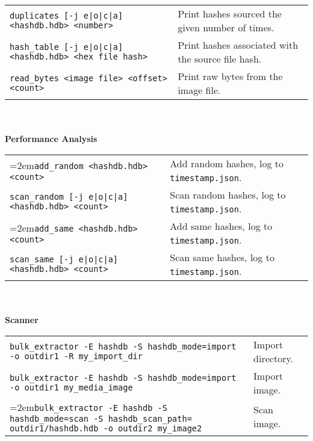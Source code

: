 \begin{footnotesize}
\begin{tabular}{p{3.6 in} p{3.0 in}}
\texttt{duplicates [-j e|o|c|a] <hashdb.hdb> <number>} & Print hashes sourced the given number of times.\\
\texttt{hash\_table [-j e|o|c|a] <hashdb.hdb> <hex file hash>} & Print hashes associated with the source file hash.\\
\texttt{read\_bytes <image file> <offset> <count>} & Print raw bytes from the image file.\\
\end{tabular}
\\
\\
\textbf{Performance Analysis}\\
\begin{tabular}{p{3.6 in} p{4 in}}
\hangindent=2em\texttt{add\_random <hashdb.hdb> <count>} & Add random hashes, log to \texttt{timestamp.json}.\\
\texttt{scan\_random [-j e|o|c|a] <hashdb.hdb> <count>} & Scan random hashes, log to \texttt{timestamp.json}.\\
\hangindent=2em\texttt{add\_same <hashdb.hdb> <count>} & Add same hashes, log to \texttt{timestamp.json}.\\
\texttt{scan\_same [-j e|o|c|a] <hashdb.hdb> <count>} & Scan same hashes, log to \texttt{timestamp.json}.\\
\end{tabular}
\\
\\
\textbf{\bulk Scanner}\\
\begin{tabular}{p{5.6 in} p{2 in}}
\texttt{bulk\_extractor -E hashdb -S hashdb\_mode=import -o outdir1 -R my\_import\_dir} & Import directory.\\
\texttt{bulk\_extractor -E hashdb -S hashdb\_mode=import -o outdir1 my\_media\_image} & Import image.\\
\hangindent=2em\texttt{bulk\_extractor -E hashdb -S hashdb\_mode=scan -S hashdb\_scan\_path= outdir1/hashdb.hdb -o outdir2 my\_image2} & Scan image.\\
\end{tabular}
\end{footnotesize}

